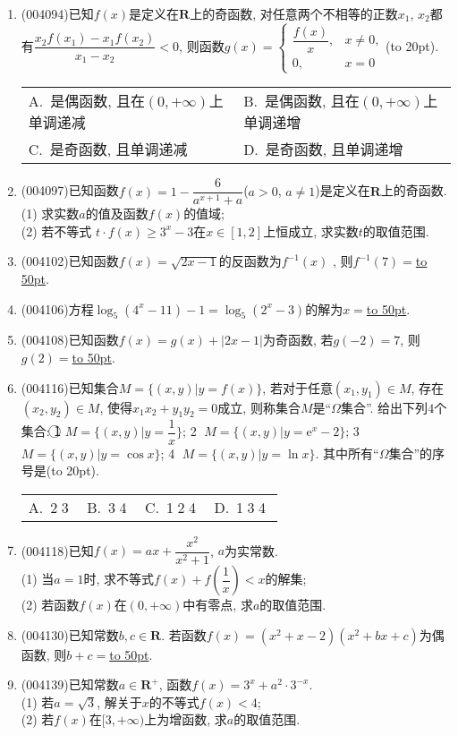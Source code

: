 \documentclass[10pt,a4paper]{article}
\newcommand{\blank}[1]{\underline{\hbox to #1pt{}}}
\newcommand{\bracket}[1]{(\hbox to #1pt{})}
\newcommand{\twoch}[4]{\par\begin{tabular}{p{.46\textwidth}p{.46\textwidth}}
A.~#1& B.~#2\\
C.~#3& D.~#4
\end{tabular}}
\newcommand{\fourch}[4]{\par\begin{tabular}{p{.23\textwidth}p{.23\textwidth}p{.23\textwidth}p{.23\textwidth}}
A.~#1 &B.~#2& C.~#3& D.~#4
\end{tabular}}
\begin{document}
\begin{enumerate}[1.]
\item {\tiny (004094)}已知$f(x)$是定义在$\mathbf{R}$上的奇函数, 对任意两个不相等的正数$x_1$, $x_2$都有$\dfrac{x_2f(x_1)-x_1f(x_2)}{x_1-x_2}<0$, 则函数$g(x)=\begin{cases} \dfrac{f(x)}x, &x\ne 0, \\ 0, & x=0 \end{cases}$\bracket{20}.
\twoch{是偶函数, 且在$(0,+\infty)$上单调递减}{是偶函数, 且在$(0,+\infty)$上单调递增}{是奇函数, 且单调递减}{是奇函数, 且单调递增}
\item {\tiny (004097)}已知函数$f(x)=1-\dfrac 6{a^{x+1}+a}$($a>0$, $a\ne 1$)是定义在$\mathbf{R}$上的奇函数.\\
(1) 求实数$a$的值及函数$f(x)$的值域;\\
(2) 若不等式 $t\cdot f(x)\ge 3^x-3$在$x\in [1,2]$上恒成立, 求实数$t$的取值范围.
\item {\tiny (004102)}已知函数$f(x)=\sqrt{2x-1}$的反函数为$f^{-1}(x)$ , 则$f^{-1}(7)=$\blank{50}.
\item {\tiny (004106)}方程$\log_5(4^x-11)-1=\log_5(2^x-3)$的解为$x=$\blank{50}.
\item {\tiny (004108)}已知函数$f(x)=g(x)+|2x-1|$为奇函数, 若$g(-2)=7$, 则$g(2)=$\blank{50}.
\item {\tiny (004116)}已知集合$M=\{(x,y)|y=f(x)\}$, 若对于任意$(x_1,y_1)\in M$, 存在$(x_2,y_2)\in M$, 使得$x_1x_2+y_1y_2=0$成立, 则称集合$M$是``$\Omega$集合''. 给出下列$4$个集合:
\textcircled{1} $M=\{(x,y) |y=\dfrac 1x \}$; \textcircled{2} $M=\{(x,y)|y=\mathrm{e}^x-2\}$; \textcircled{3} $M=\{(x,y)|y=\cos x\}$; \textcircled{4} $M=\{(x,y)|y=\ln x\}$.
其中所有``$\Omega$集合''的序号是\bracket{20}.
\fourch{\textcircled{2}\textcircled{3}}{\textcircled{3}\textcircled{4}}{\textcircled{1}\textcircled{2}\textcircled{4}}{\textcircled{1}\textcircled{3}\textcircled{4}}
\item {\tiny (004118)}已知$f(x)=ax+\dfrac{x^2}{x^2+1}$, $a$为实常数.\\
(1) 当$a=1$时, 求不等式$f(x)+f(\dfrac 1x)<x$的解集;\\
(2) 若函数$f(x)$在$(0,+\infty)$中有零点, 求$a$的取值范围.
\item {\tiny (004130)}已知常数$b,c\in \mathbf{R}$. 若函数$f(x)=(x^2+x-2)(x^2+bx+c)$为偶函数, 则$b+c=$\blank{50}.
\item {\tiny (004139)}已知常数$a\in \mathbf{R}^+$, 函数$f(x)=3^x+a^2\cdot 3^{-x}$.\\
(1) 若$a=\sqrt{3}$, 解关于$x$的不等式$f(x)<4$;\\
(2) 若$f(x)$在$[3,+\infty)$上为增函数, 求$a$的取值范围.

\end{enumerate}
\end{document}
